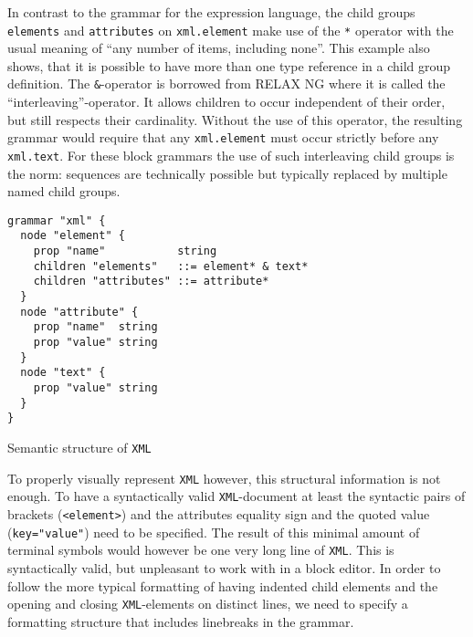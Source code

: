 \documentclass[sigconf,natbib=false,review=true]{acmart}
\begin{document}
In contrast to the grammar for the expression language, the child groups \texttt{elements} and \texttt{attributes} on \texttt{xml.element} make use of the \texttt{*} operator with the usual meaning of \enquote{any number of items, including none}. This example also shows, that it is possible to have more than one type reference in a child group definition. The \texttt{\&}-operator is borrowed from RELAX NG where it is called the \enquote{interleaving}-operator. It allows children to occur independent of their order, but still respects their cardinality. Without the use of this operator, the resulting grammar would require that any \texttt{xml.element} must occur strictly before any \texttt{xml.text}. For these block grammars the use of such interleaving child groups is the norm: sequences are technically possible but typically replaced by multiple named child groups.

\begin{listing}[H]
\begin{verbatim}
grammar "xml" {
  node "element" {
    prop "name"           string
    children "elements"   ::= element* & text*
    children "attributes" ::= attribute*
  }
  node "attribute" {
    prop "name"  string
    prop "value" string
  }
  node "text" {
    prop "value" string
  }
}
\end{verbatim}
\caption{Semantic structure of \texttt{XML}}
\label{lst:grammar-xml-structure}
\end{listing}

To properly visually represent \texttt{XML} however, this structural information is not enough. To have a syntactically valid \texttt{XML}-document at least the syntactic pairs of brackets (\texttt{<element>}) and the attributes equality sign and the quoted value (\texttt{key="value"}) need to be specified. The result of this minimal amount of terminal symbols would however be one very long line of \texttt{XML}. This is syntactically valid, but unpleasant to work with in a block editor. In order to follow the more typical formatting of having indented child elements and the opening and closing \texttt{XML}-elements on distinct lines, we need to specify a formatting structure that includes linebreaks in the grammar.
\end{document}
